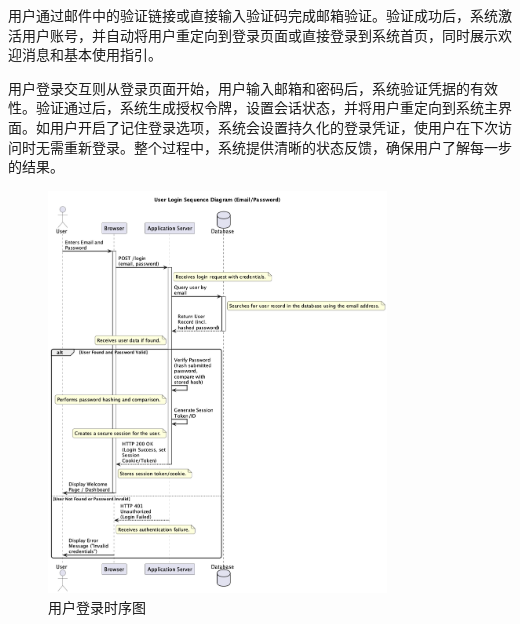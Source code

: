 \documentclass[
    report,     %
    oneside,    %
    UTF8,       %
    zihao=-4    %
]{config} %
\begin{document}
\begin{enumerate}[label=(\arabic*)]
    用户通过邮件中的验证链接或直接输入验证码完成邮箱验证。验证成功后，系统激活用户账号，并自动将用户重定向到登录页面或直接登录到系统首页，同时展示欢迎消息和基本使用指引。
    
    用户登录交互则从登录页面开始，用户输入邮箱和密码后，系统验证凭据的有效性。验证通过后，系统生成授权令牌，设置会话状态，并将用户重定向到系统主界面。如用户开启了记住登录选项，系统会设置持久化的登录凭证，使用户在下次访问时无需重新登录。整个过程中，系统提供清晰的状态反馈，确保用户了解每一步的结果。
    \begin{figure}[H]
        \centering
        \includegraphics[width=0.8\textwidth]{UML/Squence/login.png}
        \caption{用户登录时序图}
        \label{fig:UserLoginSequenceDiagram}
    \end{figure}
    \begin{figure}[H]
        \centering

\end{figure}
\end{enumerate}
\end{document}
